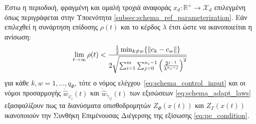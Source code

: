 
\begin{theorem}
	Έστω η περιοδική, φραγμένη και ομαλή τροχιά αναφοράς  $x_d:\mathbb{R}^+ \rightarrow \mathcal{X}_d$ επιλεγμένη όπως περιγράφεται στην Υποενότητα \ref{subsec:schema_ref_parameterization}. Εάν επιλεχθεί η συνάρτηση επίδοσης $\rho(t)$ και το κέρδος $\lambda$ έτσι ώστε να ικανοποιείται η ανίσωση:
	\begin{equation}
	\lim\limits_{t \rightarrow \infty}\rho(t) < 
	\frac{
		\frac{1}{2} \min_{k \neq w} \{ \norm{c_k - c_w}\}}
	{ 2 \sqrt{\sum_{i = 1}^{m}\sum_{j = 0}^{n_i - 1}     
			\left( \frac{2^{j-1}}{\lambda^{n_i - j}} \right)^2}  }
	\label{eq:PE_hypothesis}
	\end{equation}
	για κάθε $k,w = 1,\dots,q_\Phi$, τότε ο νόμος ελέγχου~\eqref{eq:schema_control_input} και οι νόμοι προσαρμογής $\dot{\hat{w}}_{\varphi_i}(t)$ και $\dot{\hat{w}}_{\gamma_{ij}}(t)$ των εξισώσεων \eqref{eq:schema_adapt_laws} εξασφαλίζουν πως τα διανύσματα οπισθοδρομητών $Z_\Phi(x(t))$ και $Z_\Gamma(x(t))$ ικανοποιούν την Συνθήκη Επιμένουσας Διέγερσης της εξίσωσης  \eqref{eq:pe_condition}.
\end{theorem} 


